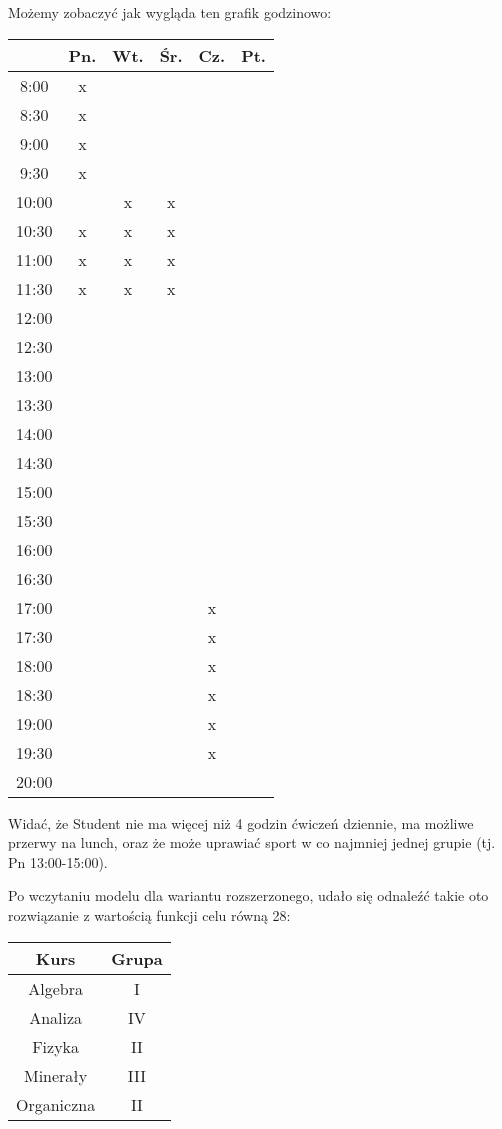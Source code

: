 \documentclass{article}
\theoremstyle{definition}
\theoremstyle{remark}
\theoremstyle{plain}
\theoremstyle{remark}
\theoremstyle{plain}
\begin{document}
Możemy zobaczyć jak wygląda ten grafik godzinowo:
\begin{table}[H]
	\centering
	\begin{tabular}{c|c|c|c|c|c}
		& Pn. & Wt. & Śr. & Cz. & Pt.\\\hline
		8:00 & x & & & & \\\hline
		8:30 & x & & & & \\\hline
		9:00 & x & & & & \\\hline
		9:30 & x & & & & \\\hline
		10:00 & & x & x & & \\\hline
		10:30 & x & x & x & & \\\hline
		11:00 & x & x & x & & \\\hline
		11:30 & x & x & x & & \\\hline
		12:00 & & & & & \\\hline
		12:30 & & & & & \\\hline
		13:00 & & & & & \\\hline
		13:30 & & & & & \\\hline
		14:00 & & & & & \\\hline
		14:30 & & & & & \\\hline
		15:00 & & & & & \\\hline
		15:30 & & & & & \\\hline
		16:00 & & & & & \\\hline
		16:30 & & & & & \\\hline
		17:00 & & & & x & \\\hline
		17:30 & & & & x & \\\hline
		18:00 & & & & x & \\\hline
		18:30 & & & & x & \\\hline
		19:00 & & & & x & \\\hline
		19:30 & & & & x & \\\hline
        20:00 & & & & & \\\hline
	\end{tabular}
\end{table}

Widać, że Student nie ma więcej niż 4 godzin ćwiczeń dziennie, ma możliwe przerwy na lunch, oraz że może uprawiać sport w co najmniej jednej grupie (tj. Pn 13:00-15:00).

Po wczytaniu modelu dla wariantu rozszerzonego, udało się odnaleźć takie oto rozwiązanie z wartością funkcji celu równą 28:
\begin{table}[H]
	\centering
	\begin{tabular}{|c|c|} \hline
		Kurs & Grupa \\\hline
        Algebra & I \\\hline
        Analiza & IV \\\hline
        Fizyka & II \\\hline
        Minerały & III \\\hline
        Organiczna & II \\\hline
	\end{tabular}
\end{table}
\end{document}
